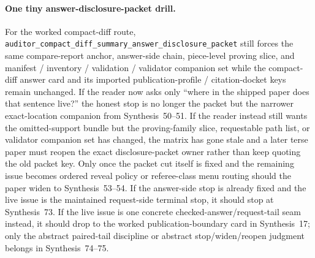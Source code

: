 \documentclass[11pt]{article}
\begin{document}
\paragraph{One tiny answer-disclosure-packet drill.}
For the worked compact-diff route, \nolinkurl{auditor_compact_diff_summary_answer_disclosure_packet} still forces the same compare-report anchor, answer-side chain, piece-level proving slice, and manifest / inventory / validation / validator companion set while the compact-diff answer card and its imported publication-profile / citation-docket keys remain unchanged. If the reader now asks only ``where in the shipped paper does that sentence live?'' the honest stop is no longer the packet but the narrower exact-location companion from Synthesis~50--51. If the reader instead still wants the omitted-support bundle but the proving-family slice, requestable path list, or validator companion set has changed, the matrix has gone stale and a later terse paper must reopen the exact disclosure-packet owner rather than keep quoting the old packet key. Only once the packet cut itself is fixed and the remaining issue becomes ordered reveal policy or referee-class menu routing should the paper widen to Synthesis~53--54. If the answer-side stop is already fixed and the live issue is the maintained request-side terminal stop, it should stop at Synthesis~73. If the live issue is one concrete checked-answer/request-tail seam instead, it should drop to the worked publication-boundary card in Synthesis~17; only the abstract paired-tail discipline or abstract stop/widen/reopen judgment belongs in Synthesis~74--75.\cite{series:workedexample}
\end{document}
